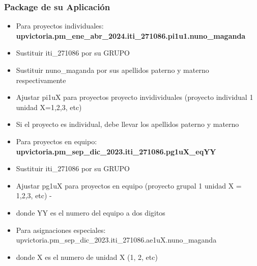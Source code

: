 \begin{frame}
\frametitle{Package de su Aplicaci\'on}
\begin{itemize}
\item Para proyectos individuales: \textbf{upvictoria.pm\_ene\_abr\_2024.iti\_271086.pi1u1.nuno\_maganda}
\item Sustituir iti\_271086 por su GRUPO
\item Sustituir nuno\_maganda por sus apellidos paterno y materno respectivamente
\item Ajustar pi1uX para proyectos proyecto invidividuales (proyecto individual 1 unidad X=1,2,3, etc)
\item Si el proyecto es individual, debe llevar los apellidos paterno y materno
\item Para proyectos en equipo: \textbf{upvictoria.pm\_sep\_dic\_2023.iti\_271086.pg1uX\_eqYY}
\item Sustituir iti\_271086 por su GRUPO
\item Ajustar pg1uX para proyectos en equipo (proyecto grupal 1 unidad X = 1,2,3, etc) -
\item donde YY es el numero del equipo a dos digitos
\item Para asignaciones especiales: upvictoria.pm\_sep\_dic\_2023.iti\_271086.ae1uX.nuno\_maganda
\item  donde X es el numero de unidad X (1, 2, etc) 
\end{itemize}

\end{frame}
